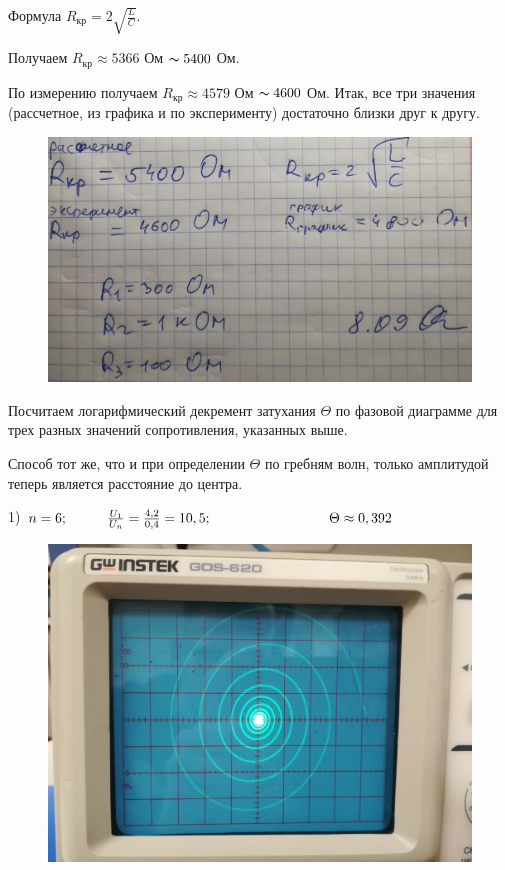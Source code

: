 \documentclass[a4paper,12pt]{article} %
\begin{document}
Формула $R_{\text{кр}} = 2\sqrt{\frac{L}{C}}$.

Получаем $R_{\text{кр}} \approx 5366$ Ом $\thicksim 5400$ Ом.

По измерению получаем $R_{\text{кр}} \approx 4579$ Ом $\thicksim 4600$ Ом. Итак, все три значения (рассчетное, из графика и по эксперименту) достаточно близки друг к другу.

\newpage

\begin{figure}[h!]
	\centering
	\includegraphics[scale=0.3]{Pictures/R.jpg}
\end{figure}

\vspace{7mm}

Посчитаем логарифмический декремент затухания $\Theta$ по фазовой диаграмме для трех разных значений сопротивления, указанных выше.

Способ тот же, что и при определении $\Theta$ по гребням волн, только амплитудой теперь является расстояние до центра.

1) $n = 6; \hspace{10mm} \frac{U_1}{U_n} = \frac{4,2}{0,4} = 10,5; \hspace{30mm} \Theta \approx 0,392$

\begin{figure}[h!]
	\centering
	\includegraphics[scale=0.22]{Pictures/1.jpg}
\end{figure}
\end{document}
